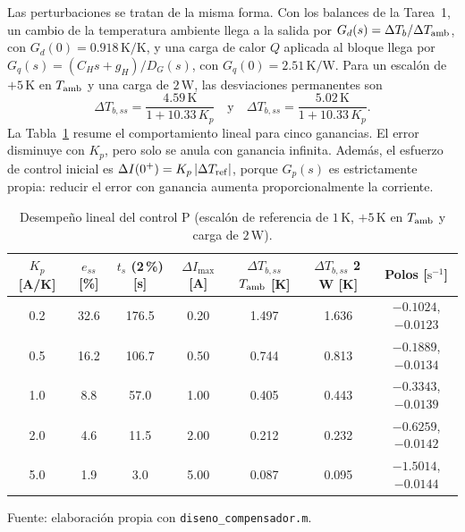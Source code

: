 \documentclass[journal,twocolumn]{IEEEtran}
\newcommand{\tableformat}{\footnotesize\setlength{\tabcolsep}{3pt}\renewcommand{\arraystretch}{1.15}}
\begin{document}
Las perturbaciones se tratan de la misma forma. Con los balances de la Tarea~1, un cambio de la temperatura ambiente llega a la salida por $G_d(s)=\Delta T_b/\Delta T_{\rm amb}$, con $G_d(0)=0.918\,\mathrm{K/K}$, y una carga de calor $Q$ aplicada al bloque llega por $G_q(s)=(C_Hs+g_H)/D_G(s)$, con $G_q(0)=2.51\,\mathrm{K/W}$. Para un escalón de $+5\,\mathrm K$ en $T_{\rm amb}$ y una carga de $2\,\mathrm W$, las desviaciones permanentes son
\begin{equation}
\Delta T_{b,ss}=\frac{4.59\,\mathrm K}{1+10.33\,K_p}\quad\text{y}\quad\Delta T_{b,ss}=\frac{5.02\,\mathrm K}{1+10.33\,K_p}.\label{eq:essD}
\end{equation}
La Tabla~\ref{tab:P_analitico} resume el comportamiento lineal para cinco ganancias. El error disminuye con $K_p$, pero solo se anula con ganancia infinita. Además, el esfuerzo de control inicial es $\Delta I(0^+)=K_p\,|\Delta T_{\rm ref}|$, porque $G_p(s)$ es estrictamente propia: reducir el error con ganancia aumenta proporcionalmente la corriente.

\begin{table}[!tbp]\centering
\caption{Desempeño lineal del control P (escalón de referencia de $1\,\mathrm K$, $+5\,\mathrm K$ en $T_{\rm amb}$ y carga de $2\,\mathrm W$).}\label{tab:P_analitico}
{\tableformat\setlength{\tabcolsep}{2.2pt}
\begin{tabular}{@{}ccccccc@{}}\toprule
\shortstack{$K_p$\\{[A/K]}} & \shortstack{$e_{ss}$\\{[\%]}} & \shortstack{$t_s$ (2\,\%)\\{[s]}} & \shortstack{$\Delta I_{\max}$\\{[A]}} & \shortstack{$\Delta T_{b,ss}$\\$T_{\rm amb}$ [K]} & \shortstack{$\Delta T_{b,ss}$\\2\,W [K]} & \shortstack{Polos\\{[$\mathrm{s^{-1}}$]}}\\\midrule
0.2 & 32.6 & 176.5 & 0.20 & 1.497 & 1.636 & $-0.1024$, $-0.0123$\\
0.5 & 16.2 & 106.7 & 0.50 & 0.744 & 0.813 & $-0.1889$, $-0.0134$\\
1.0 & 8.8 & 57.0 & 1.00 & 0.405 & 0.443 & $-0.3343$, $-0.0139$\\
2.0 & 4.6 & 11.5 & 2.00 & 0.212 & 0.232 & $-0.6259$, $-0.0142$\\
5.0 & 1.9 & 3.0 & 5.00 & 0.087 & 0.095 & $-1.5014$, $-0.0144$\\\bottomrule
\end{tabular}}
\par\smallskip\footnotesize Fuente: elaboración propia con \texttt{diseno\_compensador.m}.
\end{table}
\end{document}
